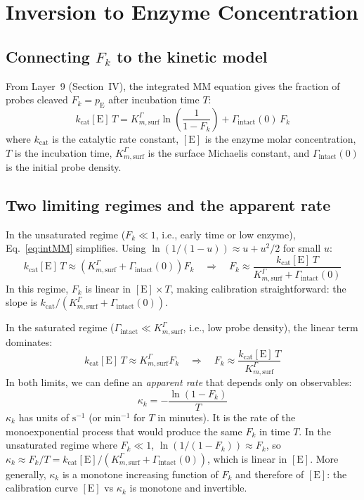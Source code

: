 \documentclass[10pt,a4paper]{article}
\numberwithin{equation}{section}
\newcommand{\Gtot}{\Gamma_{\text{intact}}}
\newcommand{\kcat}{k_{\text{cat}}}
\newcommand{\Km}{K_{m,\text{surf}}^{\Gamma}}
\newcommand{\kk}{\kappa_k}
\newcommand{\Fk}{F_k}
\begin{document}
\section{Inversion to Enzyme Concentration}
\label{sec:inversion}

\subsection{Connecting $F_k$ to the kinetic model}

From Layer~9 (Section~IV), the integrated MM equation gives the fraction
of probes cleaved $F_k = p_\text{E}$ after incubation time $T$:
\begin{equation}
  \kcat[\text{E}]\,T = \Km\ln\!\left(\frac{1}{1-\Fk}\right) + \Gtot(0)\,\Fk
  \label{eq:intMM}
\end{equation}
where $\kcat$ is the catalytic rate constant, $[\text{E}]$ is the enzyme
molar concentration, $T$ is the incubation time, $\Km$ is the surface
Michaelis constant, and $\Gtot(0)$ is the initial probe density.

\subsection{Two limiting regimes and the apparent rate}

In the unsaturated regime ($\Fk \ll 1$, i.e., early time or low enzyme),
Eq.~\eqref{eq:intMM} simplifies. Using $\ln(1/(1-u)) \approx u + u^2/2$
for small $u$:
\begin{equation}
  \kcat[\text{E}]\,T \approx \left(\Km + \Gtot(0)\right)\Fk
  \quad \Rightarrow \quad
  \Fk \approx \frac{\kcat[\text{E}]\,T}{\Km + \Gtot(0)}
  \label{eq:linlimit}
\end{equation}
In this regime, $\Fk$ is linear in $[\text{E}] \times T$, making
calibration straightforward: the slope is $\kcat / (\Km + \Gtot(0))$.

In the saturated regime ($\Gtot \ll \Km$, i.e., low probe density), the
linear term dominates:
\begin{equation}
  \kcat[\text{E}]\,T \approx \Km \Fk
  \quad \Rightarrow \quad
  \Fk \approx \frac{\kcat[\text{E}]\,T}{\Km}
  \label{eq:kmlimit}
\end{equation}
In both limits, we can define an \emph{apparent rate} that depends only on
observables:
\begin{equation}
  \boxed{
  \kk = -\frac{\ln(1-\Fk)}{T}
  }
  \label{eq:kappa}
\end{equation}
$\kk$ has units of $\text{s}^{-1}$ (or $\text{min}^{-1}$ for $T$ in
minutes). It is the rate of the monoexponential process that would
produce the same $\Fk$ in time $T$. In the unsaturated regime where
$\Fk \ll 1$, $\ln(1/(1-\Fk)) \approx \Fk$, so $\kk \approx \Fk/T =
\kcat[\text{E}]/(\Km + \Gtot(0))$, which is linear in $[\text{E}]$.
More generally, $\kk$ is a monotone increasing function of $\Fk$ and
therefore of $[\text{E}]$: the calibration curve $[\text{E}]$ vs $\kk$
is monotone and invertible.
\end{document}
